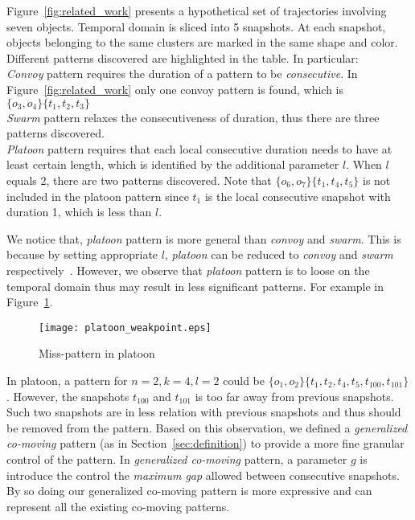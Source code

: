 \begin{example}
Figure~\ref{fig:related_work} presents a hypothetical set of trajectories involving seven objects. Temporal domain is sliced into 5 snapshots. At each snapshot, objects belonging to the same clusters are marked in the same shape and color. Different patterns discovered are highlighted in the table. In particular:\\
\emph{Convoy} pattern requires the duration of a pattern to be \emph{consecutive}. In Figure~\ref{fig:related_work} only one convoy pattern is found, which is $\{o_3,o_4\}\{t_1,t_2,t_3\}$\\
\emph{Swarm} pattern relaxes the consecutiveness of duration, thus there are three patterns discovered.\\
\emph{Platoon} pattern requires that each local consecutive duration needs to have at least certain length, which is identified by the additional parameter $l$. When $l$ equals 2, there are two patterns discovered. Note that $\{o_6,o_7\}\{t_1,t_4,t_5\}$ is not included in the platoon pattern since $t_1$ is the local consecutive snapshot with duration 1, which is less than $l$.
\end{example}

We notice that, \emph{platoon} pattern is more general than \emph{convoy} and \emph{swarm}. This is because by setting appropriate $l$, \emph{platoon} can be reduced to \emph{convoy} and \emph{swarm} respectively~\cite{li2015platoon}. However, we observe that \emph{platoon} pattern is to loose on the temporal domain thus may result in less significant patterns. For example in Figure~\ref{fig:platoon_weakpoint}.

\begin{figure}[h]
\center
\texttt{[image: platoon\_weakpoint.eps]}
\caption{Miss-pattern in platoon}
\label{fig:platoon_weakpoint}
\end{figure}

In platoon, a pattern for $n=2,k=4,l=2$ could be $\{o_1, o_2\}\{t_1,t_2,t_4,t_5,t_{100},t_{101}\}$. However, the snapshots $t_{100}$ and $t_{101}$ is too far away from previous snapshots. Such two snapshots are in less relation with previous snapshots and thus should be removed from the pattern. Based on this observation, we defined a \emph{generalized co-moving} pattern (as in Section~\ref{sec:definition}) to provide a more fine granular control of the pattern.
In \emph{generalized co-moving} pattern, a parameter $g$ is introduce the control the \emph{maximum gap} allowed between consecutive snapshots. By so doing our generalized co-moving pattern is more expressive and can represent all the existing co-moving patterns.

